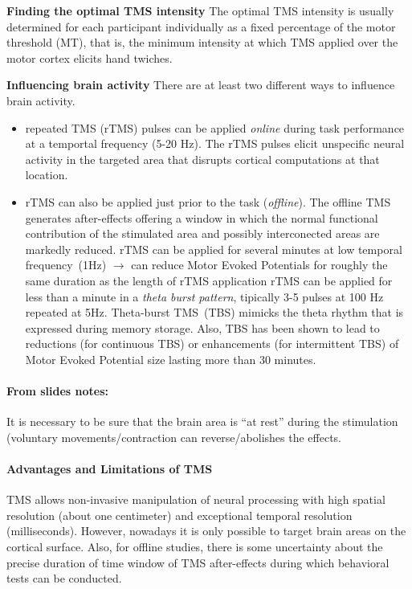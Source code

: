 \documentclass[12pt,article,oneside,a4paper]{memoir}
\begin{document}
\textbf{Finding the optimal TMS intensity} The optimal TMS intensity is usually
determined for each participant individually as a fixed percentage of the motor
threshold (MT), that is, the minimum intensity at which TMS applied over the
motor cortex elicits hand twiches.

\textbf{Influencing brain activity} There are at least two different ways to
influence brain activity.
\begin{itemize}
\item repeated TMS (rTMS) pulses can be applied \textit{online} during task
performance at a temportal frequency (5-20 Hz).
\subitem The rTMS pulses elicit unspecific neural activity in the targeted area
that disrupts cortical computations at that location.
\item rTMS can also be applied just prior to the task (\textit{offline}). The
offline TMS generates after-effects offering a window in which the normal
functional contribution of the stimulated area and possibly interconected areas
are markedly reduced.
\subitem rTMS can be applied for several minutes at low temporal
frequency~(1Hz) $\rightarrow$ can reduce Motor Evoked Potentials for roughly
the same duration as the length of rTMS application
\subitem rTMS can be applied for less than a minute in a \textit{theta burst
pattern}, tipically 3-5 pulses at 100 Hz repeated at 5Hz. Theta-burst TMS~(TBS)
mimicks the theta rhythm that is expressed during memory storage. Also, TBS has
been shown to lead to reductions (for continuous TBS) or enhancements (for
intermittent TBS) of Motor Evoked Potential size lasting more than 30 minutes.
\end{itemize}

\paragraph{From slides notes:} It is necessary to be sure that the brain area
is ``at rest'' during the stimulation (voluntary movements/contraction can
reverse/abolishes the effects.

\paragraph{Advantages and Limitations of TMS}
TMS allows non-invasive manipulation of neural processing with high spatial
resolution (about one centimeter) and exceptional temporal resolution
(milliseconds). However, nowadays it is only possible to target brain areas on
the cortical surface. Also, for offline studies, there is some uncertainty about
the precise duration of time window of TMS after-effects during which behavioral
tests can be conducted.
\end{document}
